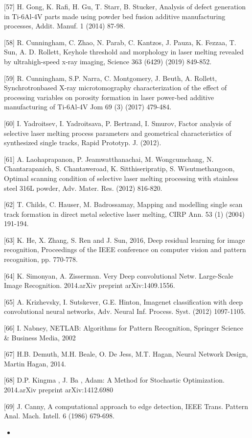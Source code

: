 \documentclass[10pt]{article}
\begin{document}
[57] H. Gong, K. Rafi, H. Gu, T. Starr, B. Stucker, Analysis of defect generation in Ti-6Al-4V parts made using powder bed fusion additive manufacturing processes, Addit. Manuf. 1 (2014) 87-98.

[58] R. Cunningham, C. Zhao, N. Parab, C. Kantzos, J. Pauza, K. Fezzaa, T. Sun, A. D. Rollett, Keyhole threshold and morphology in laser melting revealed by ultrahigh-speed x-ray imaging, Science 363 (6429) (2019) 849-852.

[59] R. Cunningham, S.P. Narra, C. Montgomery, J. Beuth, A. Rollett, Synchrotronbased X-ray microtomography characterization of the effect of processing variables on porosity formation in laser power-bed additive manufacturing of Ti-6Al-4V Jom 69 (3) (2017) 479-484.

[60] I. Yadroitsev, I. Yadroitsava, P. Bertrand, I. Smurov, Factor analysis of selective laser melting process parameters and geometrical characteristics of synthesized single tracks, Rapid Prototyp. J. (2012).

[61] A. Laohaprapanon, P. Jeamwatthanachai, M. Wongcumchang, N. Chantarapanich, S. Chantaweroad, K. Sitthiseripratip, S. Wisutmethangoon, Optimal scanning condition of selective laser melting processing with stainless steel 316L powder, Adv. Mater. Res. (2012) 816-820.

[62] T. Childs, C. Hauser, M. Badrossamay, Mapping and modelling single scan track formation in direct metal selective laser melting, CIRP Ann. 53 (1) (2004) 191-194.

[63] K. He, X. Zhang, S. Ren and J. Sun, 2016, Deep residual learning for image recognition, Proceedings of the IEEE conference on computer vision and pattern recognition, pp. 770-778.

[64] K. Simonyan, A. Zisserman. Very Deep convolutional Netw. Large-Scale Image Recognition. 2014.arXiv preprint arXiv:1409.1556.

[65] A. Krizhevsky, I. Sutskever, G.E. Hinton, Imagenet classification with deep convolutional neural networks, Adv. Neural Inf. Process. Syst. (2012) 1097-1105.

[66] I. Nabney, NETLAB: Algorithms for Pattern Recognition, Springer Science \& Business Media, 2002

[67] H.B. Demuth, M.H. Beale, O. De Jess, M.T. Hagan, Neural Network Design, Martin Hagan, 2014.

[68] D.P. Kingma , J. Ba , Adam: A Method for Stochastic Optimization. 2014.arXiv preprint arXiv:1412.6980

[69] J. Canny, A computational approach to edge detection, IEEE Trans. Pattern Anal. Mach. Intell. 6 (1986) 679-698.

\begin{itemize}
  \item 
\end{itemize}
\end{document}
